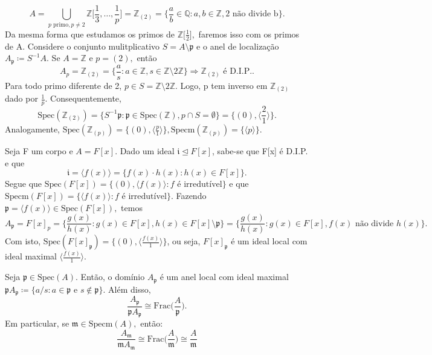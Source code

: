 \documentclass[algebraII_notes.tex]{subfiles}
\begin{document}
\begin{example}
\begin{itemize}
		      \[
			      A = \bigcup_{p \text{ primo}, p\neq 2}^{}\mathbb{Z}\biggl[\frac{1}{3}, \dotsc , \frac{1}{p}\biggr] = \mathbb{Z}_{(2)} = \biggl\{\frac{a}{b}\in \mathbb{Q}: a, b\in \mathbb{Z}, \text{2 não divide b}\biggr\}.
		      \]
		      Da mesma forma que estudamos os primos de \(\mathbb{Z}\biggl[\frac{1}{2}\biggr],\) faremos isso com os primos de A. Considere o conjunto mulitplicativo
		      \(S = A\setminus{\mathfrak{p}}\) e o anel de localização \(A_{\mathfrak{p}}\coloneqq S^{-1}A.\) Se \(A = \mathbb{Z}\) e \(p = (2),\) então
		      \[
			      A_{p} = \mathbb{Z}_{(2)} = \biggl\{\frac{a}{s}: a\in \mathbb{Z}, s\in \mathbb{Z}\setminus{2 \mathbb{Z}}\biggr\} \Rightarrow \mathbb{Z}_{(2)}\text{ é D.I.P.}.
		      \]
		      Para todo primo diferente de 2, \(p\in S = \mathbb{Z}\setminus{2 \mathbb{Z}}.\) Logo, p tem inverso em \(\mathbb{Z}_{(2)}\) dado por \(\frac{1}{p}\). Consequentemente,
		      \[
			      \mathrm{Spec}(\mathbb{Z}_{(2)}) = \biggl\{S^{-1}\mathfrak{p}: \mathfrak{p}\in \mathrm{Spec}(\mathbb{Z}), p\cap S = \emptyset \biggr\} = \{(0), \langle \frac{2}{1} \rangle\}.
		      \]
		      Analogamente, \(\mathrm{Spec}(\mathbb{Z}_{(p)}) = \{(0), \langle \frac{p}{1} \rangle\}, \mathrm{Specm}(\mathbb{Z}_{(p)}) = \{\langle p \rangle\}\).
	\end{itemize}
\end{example}
\begin{example}
	Seja F um corpo e \(A = F[x]\). Dado um ideal \(\mathfrak{i}\trianglelefteq F[x]\), sabe-se que F[x] é D.I.P. e que
	\[
		\mathfrak{i} = \langle f(x) \rangle = \{f(x)\cdot h(x):h(x)\in F[x]\}.
	\]
	Segue que \(\mathrm{Spec}(F[x]) = \{(0), \langle f(x) \rangle: f \text{ é irredutível}\}\) e que \(\mathrm{Specm}(F[x]) = \{\langle f(x) \rangle: f \text{ é irredutível}\}\).
	Fazendo \(\mathfrak{p} = \langle f(x) \rangle\in \mathrm{Spec}(F[x]),\) temos
	\[
		A_{\mathfrak{p}} = F[x]_{p} = \biggl\{\frac{g(x)}{h(x)}: g(x)\in F[x], h(x)\in F[x]\setminus{\mathfrak{p}}\biggr\} = \biggl\{\frac{g(x)}{h(x)}: g(x)\in F[x], f(x)\text{ não divide }h(x)\biggr\}.
	\]
	Com isto, \(\mathrm{Spec}(F[x]_{\mathfrak{p}}) = \{(0), \langle \frac{f(x)}{1} \rangle\}\), ou seja, \(F[x]_{\mathfrak{p}}\) é um ideal local com ideal maximal \(\langle \frac{f(x)}{1} \rangle.\)
\end{example}
\begin{prop*}
	Seja \(\mathfrak{p}\in \mathrm{Spec}(A)\). Então, o domínio \(A_{\mathfrak{p}}\) é um anel local
	com ideal maximal \(\mathfrak{p}A_{\mathfrak{p}}\coloneqq \{a/s: a\in \mathfrak{p}\text{ e }s\not\in \mathfrak{p}\}.\) Além disso,
	\[
		\frac{A_{\mathfrak{p}}}{\mathfrak{p}A_{\mathfrak{p}}}\cong{\mathrm{Frac}\biggl(\frac{A}{\mathfrak{p}}\biggr).}
	\]
	Em particular, se \(\mathfrak{m}\in \mathrm{Specm}(A),\) então:
	\[
		\frac{A_{\mathfrak{m}}}{\mathfrak{m}A_{\mathfrak{m}}}\cong{\mathrm{Frac}\biggl(\frac{A}{\mathfrak{m}}\biggr)} \cong{\frac{A}{\mathfrak{m}}}
	\]
\end{prop*}
\end{document}
